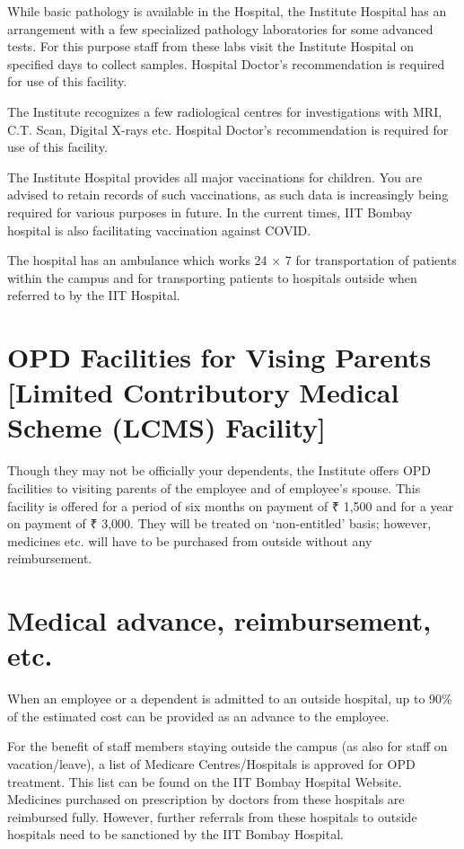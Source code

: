 \documentclass[
  10pt,
  a5paper,
  10pt,
  openany]{amsbook}
\begin{document}
While basic pathology is available in the Hospital, the Institute
Hospital has an arrangement with a few specialized pathology
laboratories for some advanced tests. For this purpose staff from these
labs visit the Institute Hospital on specified days to collect samples.
Hospital Doctor's recommendation is required for use of this facility.

The Institute recognizes a few radiological centres for investigations
with MRI, C.T. Scan, Digital X-rays etc. Hospital Doctor's
recommendation is required for use of this facility.

The Institute Hospital provides all major vaccinations for children. You
are advised to retain records of such vaccinations, as such data is
increasingly being required for various purposes in future. In the
current times, IIT Bombay hospital is also facilitating vaccination
against COVID.

The hospital has an ambulance which works 24 × 7 for transportation of
patients within the campus and for transporting patients to hospitals
outside when referred to by the IIT Hospital.

\section{OPD Facilities for Vising Parents {[}Limited Contributory
Medical Scheme (LCMS)
Facility{]}}\label{opd-facilities-for-vising-parents-limited-contributory-medical-scheme-lcms-facility}

Though they may not be officially your dependents, the Institute offers
OPD facilities to visiting parents of the employee and of employee's
spouse. This facility is offered for a period of six months on payment
of ₹ 1,500 and for a year on payment of ₹ 3,000. They will be treated on
`non-entitled' basis; however, medicines etc. will have to be purchased
from outside without any reimbursement.

\section{Medical advance, reimbursement,
etc.}\label{medical-advance-reimbursement-etc.}

When an employee or a dependent is admitted to an outside hospital, up
to 90\% of the estimated cost can be provided as an advance to the
employee.

For the benefit of staff members staying outside the campus (as also for
staff on vacation/leave), a list of Medicare Centres/Hospitals is
approved for OPD treatment. This list can be found on the IIT Bombay
Hospital Website. Medicines purchased on prescription by doctors from
these hospitals are reimbursed fully. However, further referrals from
these hospitals to outside hospitals need to be sanctioned by the IIT
Bombay Hospital.
\end{document}
